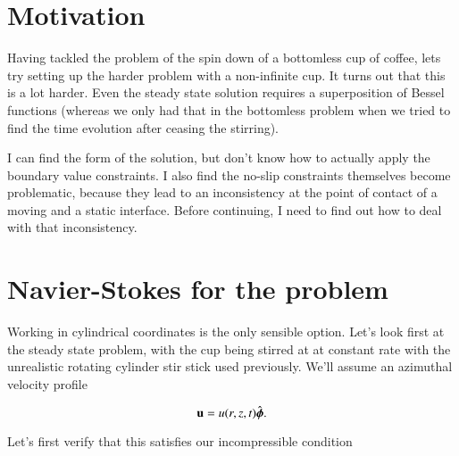 %
%
%
%
%
%
%
%
%
%
%
%
\label{chap:coffeeCupWithBottom}
\section{Motivation}

Having tackled the problem of the spin down of a bottomless cup of coffee, lets try setting up the harder problem with a non-infinite cup.  It turns out that this is a lot harder.  Even the steady state solution requires a superposition of Bessel functions (whereas we only had that in the bottomless problem when we tried to find the time evolution after ceasing the stirring).  

I can find the form of the solution, but don't know how to actually apply the boundary value constraints.  I also find the no-slip constraints themselves become problematic, because they lead to an inconsistency at the point of contact of a moving and a static interface.  Before continuing, I need to find out how to deal with that inconsistency.

\section{Navier-Stokes for the problem}

Working in cylindrical coordinates is the only sensible option.  Let's look first at the steady state problem, with the cup being stirred at at constant rate with the unrealistic rotating cylinder  stir stick used previously.  We'll assume an azimuthal velocity profile

\begin{equation}\label{eqn:coffeeCupWithBottom:10}
\mathbf{u} = u(r, z, t) \hat{\boldsymbol{\phi}}.
\end{equation}

Let's first verify that this satisfies our incompressible condition


